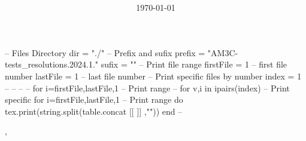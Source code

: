 \documentclass[
  class=article,
  multi={minipage},
  border={3mm},
]{standalone}
\title{\huge\bfseries\color{Emph}\mytitle}
\author{\Large\myauthor}
\date{\Large\today}
\begin{document}
\mymaketitle
\begin{luacode*}
  -- Files Directory
  dir = "./"
  -- Prefix and sufix
  prefix = "AM3C-tests_resolutions.2024.1."
  sufix  = ""
  -- Print file range
  firstFile = 1 -- first file number
  lastFile  = 1 -- last  file number
  -- Print specific files by number
  index = {1}
  -- %
  -- %
  -- %
  -- for i=firstFile,lastFile,1 -- Print range
  -- for v,i in ipairs(index)   -- Print specific
  for i=firstFile,lastFile,1 -- Print range
  do
    tex.print(string.split(table.concat{
    [[
      \newpage
    ]]
    },"\n"))
  end
  -- %
\end{luacode*},
\end{document}

